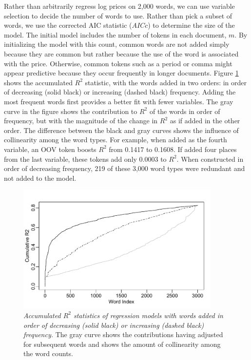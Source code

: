 \documentclass[10pt]{article}
\begin{document}
Rather than arbitrarily regress log prices on 2,000 words, we can use variable selection to decide the number of words to use.  Rather than pick a subset of words, we use the corrected AIC statistic ($AICc$) to determine the size of the model.  The initial model includes the number of tokens in each document, $m$.  By initializing the model with this count, common words are not added simply because they are common but rather because the use of the word is associated with the price.  Otherwise, common tokens such as a period or comma might appear predictive  because they occur frequently in longer documents.  Figure \ref{fig:cumr2} shows the accumulated $R^2$ statistic, with the words added in two orders: in order of decreasing (solid black) or increasing (dashed black) frequency.  Adding the most frequent words first provides a better fit with fewer variables.  The gray curve in the figure shows the contribution to $R^2$ of the words in order of frequency, but with the magnitude of the change in $R^2$ as if added in the other order.  The difference between the black and gray curves shows the influence of collinearity among the word types.  For example, when added as the fourth variable, an OOV token boosts $R^2$ from 0.1417 to 0.1608.  If added four places from the last variable, these tokens add only 0.0003 to  $R^2$.  When constructed in order of decreasing frequency, 219 of these 3,000 word types were redundant and not added to the model.


\begin{figure}
\caption{  \label{fig:cumr2}  
  {\sl Accumulated $R^2$ statistics of regression models with words added in order of decreasing (solid black) or increasing (dashed black) frequency.} The gray curve shows the contributions having adjusted for subsequent words and shows the amount of collinearity among the word counts.}  
  \centerline{ \includegraphics[width=4in]{figures/cum_r2.pdf} }
\end{figure}
\end{document}
